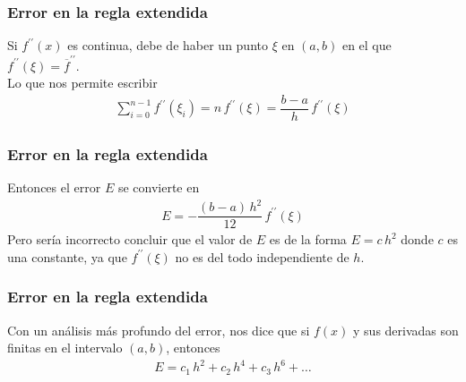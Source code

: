 \begin{frame}
\frametitle{Error en la regla extendida}
Si $f^{\prime \prime} (x)$ es continua, debe de haber un punto $\xi$ en $(a, b)$ en el que ${f}^{\prime \prime}(\xi) = \overline{f}^{\prime \prime}$.
\\
\bigskip
\pause
Lo que nos permite escribir
\begin{align*}
\sum_{i=0}^{n-1} f^{\prime \prime} (\xi_{i}) = n \, f^{\prime \prime} (\xi) = \dfrac{b-a}{h} \, f^{\prime \prime} (\xi)
\end{align*}
\end{frame}
\begin{frame}
\frametitle{Error en la regla extendida}
Entonces el error $E$ se convierte en
\begin{align*}
E = - \dfrac{(b -a) \, h^{2}}{12} \, f^{\prime \prime} (\xi)
\end{align*}
\pause
Pero sería incorrecto concluir que el valor de $E$ es de la forma $E = c \, h^{2}$ donde $c$ es una constante, ya que $f^{\prime \prime} (\xi)$ no es del todo independiente de $h$.
\end{frame}
\begin{frame}
\frametitle{Error en la regla extendida}
Con un análisis más profundo del error, nos dice que si $f(x)$ y sus derivadas son finitas en el intervalo $(a, b)$, entonces
\begin{align*}
E = c_{1} \, h^{2} + c_{2} \, h^{4} + c_{3} \, h^{6} + \ldots 
\end{align*}
\end{frame}
